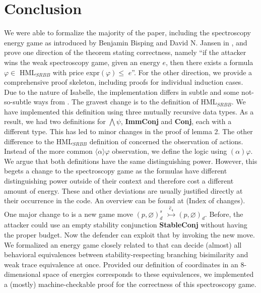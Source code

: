 \section{Conclusion}
We were able to formalize the majority of the paper, including the spectroscopy energy game as introduced by Benjamin Bisping and David N. Jansen in \cite{bisping2023lineartimebranchingtime}, 
and prove one direction of the theorem stating correctness, namely ``if the attacker wins the weak spectroscopy game, given an energy $e$, then there exists a formula $\varphi \in$ HML$_{SRBB}$ with price expr$(\varphi) \leq$ $e$''. 
For the other direction, we provide a comprehensive proof skeleton, including proofs for individual induction cases.
\\
Due to the nature of Isabelle, the implementation differs in subtle and some not-so-subtle ways from \cite{bisping2023lineartimebranchingtime}. The gravest change is to the definition of HML$_{SRBB}$. 
We have implemented this definition using three mutually recursive data types. As a result, we had two definitions for $\bigwedge\psi$, \textbf{ImmConj} and \textbf{Conj}, each with a different type. 
This has led to minor changes in the proof of lemma 2. The other difference to the HML$_{SRBB}$ definition of \cite{bisping2023lineartimebranchingtime} concerned the observation of actions. 
Instead of the more common $\langle \alpha \rangle\varphi$ observation, we define the logic using $(\alpha)\varphi$. We argue that both definitions have the same distinguishing power. However, 
this begets a change to the spectroscopy game as the formulas have different distinguishing power outside of their context and therefore cost a different amount of energy.
These and other deviations are usually justified directly at their occurrence in the code. An overview can be found at (Index of changes). 
\\
One major change to \cite{bisping2023lineartimebranchingtime} is a new game move $(p,\varnothing)_{d}^{s}$ $\overset{\hat{e}_4}{\rightarrowtail} (p,\varnothing)_d$. 
Before, the attacker could use an empty stability conjunction \textbf{StableConj} without having the proper budget. Now the defender can exploit that by invoking the new move.
\\
We formalized an energy game closely related to \cite{bisping2023lineartimebranchingtime} that can decide (almost) all behavioral equivalences between stability-respecting branching bisimilarity and weak trace equivalence at once.
Provided our definition of coordinates in an 8-dimensional space of energies corresponds to these equivalences, we implemented a (mostly) machine-checkable proof for the correctness of this spectroscopy game.